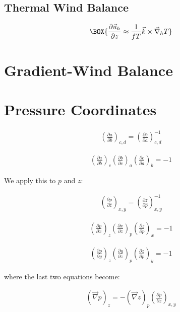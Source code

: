 \subsection{Thermal Wind Balance}

\begin{align}\label{Thermal Wind}
    \BOX{\frac{\partial\vec{u}_h}{\partial z}\approx\frac{1}{fT}\vec{k}\times\vec{\nabla}_hT}
\end{align}

\section{Gradient-Wind Balance}

\section{Pressure Coordinates}

\begin{align*}
    \left(\frac{\partial a}{\partial b}\right)_{c,d}=\left(\frac{\partial b}{\partial a}\right)_{c,d}^{-1}
\end{align*}

\begin{align*}
    \left(\frac{\partial a}{\partial b}\right)_c
    \left(\frac{\partial b}{\partial c}\right)_a
    \left(\frac{\partial c}{\partial a}\right)_b
    =-1
\end{align*}

\noindent We apply this to $p$ and $z$:

\begin{align}
    \left(\frac{\partial p}{\partial z}\right)_{x,y}=\left(\frac{\partial z}{\partial p}\right)_{x,y}^{-1}
\end{align}

\begin{align*}
    \left(\frac{\partial p}{\partial x}\right)_z
    \left(\frac{\partial x}{\partial z}\right)_p
    \left(\frac{\partial z}{\partial p}\right)_x
    =-1
\end{align*}

\begin{align*}
    \left(\frac{\partial p}{\partial y}\right)_z
    \left(\frac{\partial y}{\partial z}\right)_p
    \left(\frac{\partial z}{\partial p}\right)_y
    =-1
\end{align*}

\noindent where the last two equations become:

\begin{align}
    \left(\vec{\nabla}p\right)_z=-\left(\vec{\nabla}z\right)_p\left(\frac{\partial p}{\partial z}\right)_{x,y}
\end{align}

